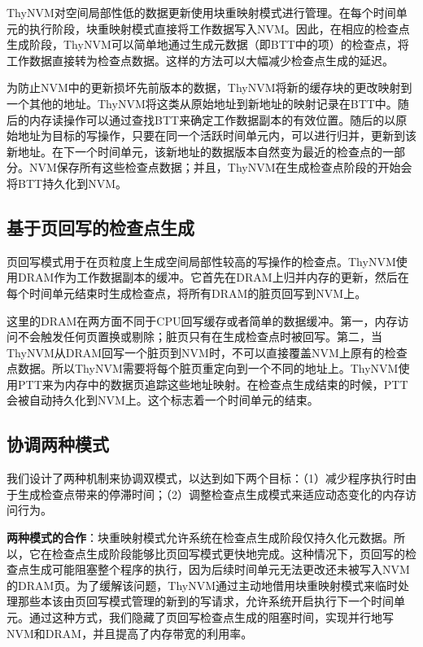 ThyNVM对空间局部性低的数据更新使用块重映射模式进行管理。在每个时间单元的执行阶段，块重映射模式直接将工作数据写入NVM。因此，在相应的检查点生成阶段，ThyNVM可以简单地通过生成元数据（即BTT中的项）的检查点，将工作数据直接转为检查点数据。这样的方法可以大幅减少检查点生成的延迟。

为防止NVM中的更新损坏先前版本的数据，ThyNVM将新的缓存块的更改映射到一个其他的地址。ThyNVM将这类从原始地址到新地址的映射记录在BTT中。随后的内存读操作可以通过查找BTT来确定工作数据副本的有效位置。随后的以原始地址为目标的写操作，只要在同一个活跃时间单元内，可以进行归并，更新到该新地址。在下一个时间单元，该新地址的数据版本自然变为最近的检查点的一部分。NVM保存所有这些检查点数据；并且，ThyNVM在生成检查点阶段的开始会将BTT持久化到NVM。

\subsection{基于页回写的检查点生成}
\label{subsec:page-writeback}

页回写模式用于在页粒度上生成空间局部性较高的写操作的检查点。ThyNVM使用DRAM作为工作数据副本的缓冲。它首先在DRAM上归并内存的更新，然后在每个时间单元结束时生成检查点，将所有DRAM的脏页回写到NVM上。

这里的DRAM在两方面不同于CPU回写缓存或者简单的数据缓冲。第一，内存访问不会触发任何页置换或剔除；脏页只有在生成检查点时被回写。第二，当ThyNVM从DRAM回写一个脏页到NVM时，不可以直接覆盖NVM上原有的检查点数据。所以ThyNVM需要将每个脏页重定向到一个不同的地址上。ThyNVM使用PTT来为内存中的数据页追踪这些地址映射。在检查点生成结束的时候，PTT会被自动持久化到NVM上。这个标志着一个时间单元的结束。

\subsection{协调两种模式}
\label{subsec:coordination}

我们设计了两种机制来协调双模式，以达到如下两个目标：（1）减少程序执行时由于生成检查点带来的停滞时间；（2）调整检查点生成模式来适应动态变化的内存访问行为。

\textbf{两种模式的合作}：块重映射模式允许系统在检查点生成阶段仅持久化元数据。所以，它在检查点生成阶段能够比页回写模式更快地完成。这种情况下，页回写的检查点生成可能阻塞整个程序的执行，因为后续时间单元无法更改还未被写入NVM的DRAM页。为了缓解该问题，ThyNVM通过主动地借用块重映射模式来临时处理那些本该由页回写模式管理的新到的写请求，允许系统开启执行下一个时间单元。通过这种方式，我们隐藏了页回写检查点生成的阻塞时间，实现并行地写NVM和DRAM，并且提高了内存带宽的利用率。

